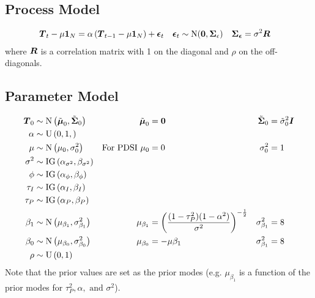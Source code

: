 \documentclass{article}\usepackage[]{graphicx}\usepackage[]{color}
\def\bm#1{\mbox{\boldmath $#1$}}
\begin{document}
\subsection{Process Model}
%
\begin{align*}
\bm{T}_t - \mu \bm{1}_N & = \alpha \left( \bm{T}_{t - 1} - \mu \bm{1}_N \right) + \bm{\epsilon}_t  & \bm{\epsilon}_t & \sim \mbox{N}(\bm{0}, \bm{\Sigma}_\epsilon) & \bm{\Sigma_\epsilon} & = \sigma^2 \bm{R}
\end{align*}
%
where $\bm{R}$ is a correlation matrix with 1 on the diagonal and $\rho$ on the off-diagonals.
%
%
\subsection{Parameter Model}
%
\begin{align*}
%
\bm{T}_0 & \sim \mbox{N}\left( \tilde{\bm{\mu}}_0, \tilde{\bm{\Sigma}}_0 \right) & \tilde{\bm{\mu}}_0 & = \bm{0} & \tilde{\bm{\Sigma}}_0 & = \tilde{\sigma}^2_0 \bm{I}\\
%
\alpha & \sim \mbox{U}\left( 0, 1, \right)\\
%
\mu & \sim \mbox{N} \left( \mu_0, \sigma^2_0 \right) & \mbox{For PDSI } \mu_0 & = 0 & \sigma^2_0 & = 1 \\
%
\sigma^2 & \sim \mbox{IG}\left( \alpha_{\sigma^2}, \beta_{\sigma^2} \right)\\
%
\phi & \sim \mbox{IG}\left( \alpha_\phi, \beta_\phi \right)\\
%
\tau_I & \sim \mbox{IG}\left( \alpha_I, \beta_I \right)\\
%
\tau_P & \sim \mbox{IG}\left( \alpha_P, \beta_P \right)\\
%
\beta_1 & \sim \mbox{N} \left( \mu_{\beta_1}, \sigma^2_{\beta_1} \right) & \mu_{\beta_1} & = \left( \frac{(1 - \tau_P^2) (1 - \alpha^2)} {\sigma^2} \right)^{ - \frac{1} {2} } & \sigma^2_{\beta_1} & = 8 \\
%
\beta_0 & \sim \mbox{N} \left( \mu_{\beta_0}, \sigma^2_{\beta_0} \right) & \mu_{\beta_0} & = - \mu \beta_1 & \sigma^2_{\beta_1} & = 8 \\
%
\rho & \sim \mbox{U}\left( 0, 1 \right)\\
%
\end{align*}
%
Note that the prior values are set as the prior modes (e.g. $\mu_{\beta_1}$ is a function of the prior modes for $\tau^2_P, \alpha, \mbox{ and } \sigma^2$).
%
%
\end{document}
